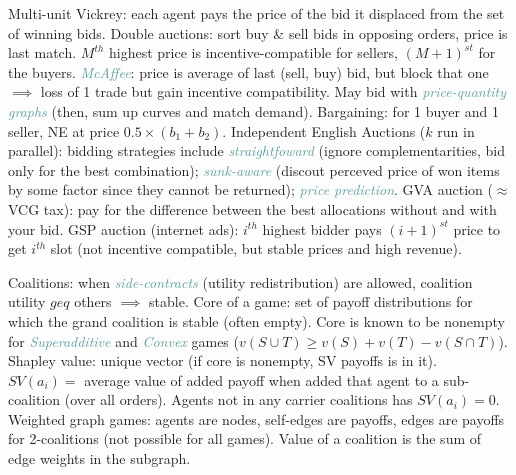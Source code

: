 \documentclass[10pt,a4paper,landscape]{article}
\newcommand{\concept}[1]{\textcolor{Emerald}{#1}} %
\newcommand{\subconcept}[1]{\textcolor{CadetBlue}{\textit{#1}}}
\renewcommand{\section}[1]{
  \vspace{-0.3cm}
  \begin{center}
    \color{Bittersweet}
    \hrulefill{\small~~#1~~}\hrulefill
  \end{center}
  \vspace{-0.3cm}
}
\renewcommand{\subsection}[1]{\section{#1}}
\begin{document}
\begin{multicols*}{4}
\concept{Multi-unit Vickrey}: each agent pays the price of the bid it displaced from the set of winning bids.
\concept{Double auctions}: sort buy \& sell bids in opposing orders, price is last match. $M^{th}$ highest price is incentive-compatible for sellers, $(M+1)^{st}$ for the buyers. \subconcept{McAffee}: price is average of last (sell, buy) bid, but block that one $\implies$ loss of 1 trade but gain incentive compatibility. May bid with \subconcept{price-quantity graphs} (then, sum up curves and match demand).
\concept{Bargaining}: for 1 buyer and 1 seller, NE at price $0.5 \times (b_1 + b_2)$.
\concept{Independent English Auctions} ($k$ run in parallel): bidding strategies include \subconcept{straightfoward} (ignore complementarities, bid only for the best combination); \subconcept{sunk-aware} (discout perceved price of won items by some factor since they cannot be returned); \subconcept{price prediction}.
\concept{GVA auction} ($\approx$ VCG tax): pay for the difference between the best allocations without and with your bid.
\concept{GSP auction} (internet ads): $i^{th}$ highest bidder pays $(i+1)^{st}$ price to get $i^{th}$ slot (not incentive compatible, but stable prices and high revenue).

\subsection{Coalitions}

\concept{Coalitions}: when \subconcept{side-contracts} (utility redistribution) are allowed, coalition utility $geq$ others $\implies$ stable.
\concept{Core} of a game: set of payoff distributions for which the grand coalition is stable (often empty).
Core is known to be nonempty for \subconcept{Superadditive} and \subconcept{Convex} games ($v(S \cup T) \geq v(S) + v(T) - v(S \cap T)$).
\concept{Shapley value}: unique vector (if core is nonempty, SV payoffs is in it). $SV(a_i) = $ average value of added payoff when added that agent to a sub-coalition (over all orders). Agents not in any carrier coalitions has $SV(a_i) = 0$.
\concept{Weighted graph games}: agents are nodes, self-edges are payoffs, edges are payoffs for 2-coalitions (not possible for all games). Value of a coalition is the sum of edge weights in the subgraph.

\subsection{Voting protocols}


\end{multicols*}
\end{document}
